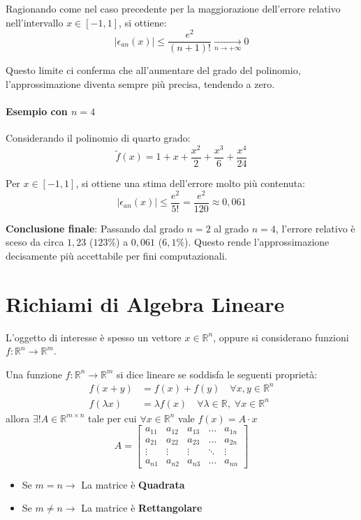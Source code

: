 \documentclass[a4paper,12pt]{article}
\begin{document}
	Ragionando come nel caso precedente per la maggiorazione dell'errore relativo nell'intervallo $x \in [-1, 1]$, si ottiene:
	\begin{equation}
		|\epsilon_{an}(x)| \leqslant \frac{e^2}{(n+1)!} \xrightarrow[n \to +\infty]{} 0
	\end{equation}
	
	Questo limite ci conferma che all'aumentare del grado del polinomio, l'approssimazione diventa sempre più precisa, tendendo a zero.
	
	\paragraph{Esempio con $n=4$}
	Considerando il polinomio di quarto grado:
	\[ \tilde{f}(x) = 1 + x + \frac{x^2}{2} + \frac{x^3}{6} + \frac{x^4}{24} \]
	
	Per $x \in [-1, 1]$, si ottiene una stima dell'errore molto più contenuta:
	\begin{equation}
		|\epsilon_{an}(x)| \leqslant \frac{e^2}{5!} = \frac{e^2}{120} \approx 0,061
	\end{equation}
	
	\begin{tcolorbox}[colback=green!5!white, colframe=green!50!black]
		\textbf{Conclusione finale}: Passando dal grado $n=2$ al grado $n=4$, l'errore relativo è sceso da circa $1,23$ ($123\%$) a $0,061$ ($6,1\%$). Questo rende l'approssimazione decisamente più accettabile per fini computazionali.
	\end{tcolorbox}
	
	\section{Richiami di Algebra Lineare}
	L'oggetto di interesse è spesso un vettore $x \in \mathbb{R}^n$, oppure si considerano funzioni $f:\mathbb{R}^n \rightarrow \mathbb{R}^m$. 
	
	Una funzione $f:\mathbb{R}^n \rightarrow \mathbb{R}^m$ si dice lineare se soddisfa le seguenti proprietà:
	\begin{align*}
		f(x+y) &= f(x) + f(y) \quad \forall x, y \in \mathbb{R}^n \\
		f(\lambda x) &= \lambda f(x) \quad \forall \lambda \in \mathbb{R}, \; \forall x \in \mathbb{R}^n
	\end{align*}
	allora $\exists{!} A \in \mathbb{R}^{m \times n}$ tale per cui $\forall x \in \mathbb{R}^n$ vale $f(x) = A \cdot x$
	\[
	A = \begin{bmatrix}
		a_{11} & a_{12} & a_{13} & \dots  & a_{1n} \\
		a_{21} & a_{22} & a_{23} & \dots  & a_{2n} \\
		\vdots & \vdots & \vdots & \ddots & \vdots \\
		a_{n1} & a_{n2} & a_{n3} & \dots  & a_{nn}
	\end{bmatrix}
	\]
	\begin{itemize}
		\item Se $m = n \rightarrow $ La matrice è \textbf{Quadrata}
		\item Se $m \neq n \rightarrow$ La matrice è \textbf{Rettangolare}
	\end{itemize}
	
\end{document}
